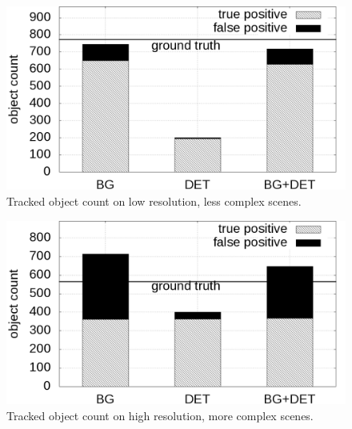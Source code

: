 \begin{figure}
  \centering
    \includegraphics[width=\linewidth]{./img/evaluation/count_lowRes.png}
    \caption{Tracked object count on low resolution, less complex scenes.}
    \label{fig:kf-eval-count-low}
\end{figure}
\begin{figure}
    \centering
    \includegraphics[width=\linewidth]{./img/evaluation/count_highRes.png}
    \caption{Tracked object count on high resolution, more complex scenes.}
    \label{fig:kf-eval-count-high}
\end{figure}